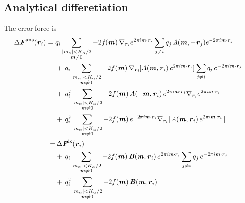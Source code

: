 \documentclass[aps,pre,preprint]{revtex4-1}
\renewcommand{\v}[1]{\textbf{\textit{#1}}}
\begin{document}
\subsection{Analytical differetiation}

The error force is 
\begin{align}\nonumber
  \Delta\v F^{\textrm{ana}}(\v r_i)
  =\;&
  q_i
  \sum_{
    \begin{subarray}{c}
      \vert m_{\alpha}\vert < K_\alpha/2\\
      \v m\neq 0
    \end{subarray}}
  -2f(\v m)\,
  \nabla_{\v r_i}
  e^{2\pi i\v m\cdot \v r_i}
  \sum_{j\neq i}q_j\,
  A(\v m, -\v r_j)
  e^{-2\pi i\v m\cdot\v r_j} \\\nonumber
  & +\,
  q_i
  \sum_{
    \begin{subarray}{c}
      \vert m_{\alpha}\vert < K_\alpha/2\\
      \v m\neq 0
    \end{subarray}}
  -2f(\v m)\,
  \nabla_{\v r_i}
  [A(\v m, \v r_i)\,
  e^{2\pi i\v m\cdot \v r_i} ]
  \sum_{j\neq i}q_j\,
  e^{-2\pi i\v m\cdot\v r_j} \\\nonumber
  & +\,
  q^2_i
  \sum_{
    \begin{subarray}{c}
      \vert m_{\alpha}\vert < K_\alpha/2\\
      \v m\neq 0
    \end{subarray}}
  -2f(\v m)\,
  A(-\v m, \v r_i)\,e^{2\pi i\v m\cdot \v r_i} \nabla_{\v r_i}e^{2\pi i\v m\cdot\v r_i} \\
  & +\,
  q^2_i
  \sum_{
    \begin{subarray}{c}
      \vert m_{\alpha}\vert < K_\alpha/2\\
      \v m\neq 0
    \end{subarray}}
  -2f(\v m)\,
  e^{-2\pi i\v m\cdot \v r_i}
  \nabla_{\v r_i} [\,A(\v m, \v r_i) \,e^{2\pi i\v m\cdot\v r_i}\,]  \\\nonumber
  =&\,
  \Delta\v F^{\textrm{ik}}(\v r_i)\\\nonumber
  & +\,
  q_i
  \sum_{
    \begin{subarray}{c}
      \vert m_{\alpha}\vert < K_\alpha/2\\
      \v m\neq 0
    \end{subarray}}
  -2f(\v m)\,
  \v B(\v m, \v r_i)\,e^{2\pi i\v m\cdot \v r_i}
  \sum_{j\neq i}q_j\,
  e^{-2\pi i\v m\cdot\v r_j} \\
  & +\,
  q^2_i
  \sum_{
    \begin{subarray}{c}
      \vert m_{\alpha}\vert < K_\alpha/2\\
      \v m\neq 0
    \end{subarray}}
  -2f(\v m)\,\v B(\v m, \v r_i) 
\end{align}
\end{document}
